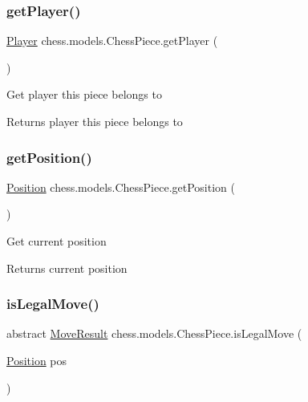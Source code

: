 \subsubsection{\texorpdfstring{get\+Player()}{getPlayer()}}
{\footnotesize\ttfamily \mbox{\hyperlink{enumchess_1_1models_1_1enums_1_1_player}{Player}} chess.\+models.\+Chess\+Piece.\+get\+Player (\begin{DoxyParamCaption}{ }\end{DoxyParamCaption})}

Get player this piece belongs to

\begin{DoxyReturn}{Returns}
player this piece belongs to 
\end{DoxyReturn}
\mbox{\label{classchess_1_1models_1_1_chess_piece_a4ce783eeb2ec6d5cd83af05c11fe8cdb}} 
\subsubsection{\texorpdfstring{get\+Position()}{getPosition()}}
{\footnotesize\ttfamily \mbox{\hyperlink{classchess_1_1models_1_1_position}{Position}} chess.\+models.\+Chess\+Piece.\+get\+Position (\begin{DoxyParamCaption}{ }\end{DoxyParamCaption})}

Get current position

\begin{DoxyReturn}{Returns}
current position 
\end{DoxyReturn}
\mbox{\label{classchess_1_1models_1_1_chess_piece_a60088166dd440bf51de4514c3e57841e}} 
\subsubsection{\texorpdfstring{is\+Legal\+Move()}{isLegalMove()}}
{\footnotesize\ttfamily abstract \mbox{\hyperlink{enumchess_1_1models_1_1enums_1_1_move_result}{Move\+Result}} chess.\+models.\+Chess\+Piece.\+is\+Legal\+Move (\begin{DoxyParamCaption}\item[{\mbox{\hyperlink{classchess_1_1models_1_1_position}{Position}}}]{pos }\end{DoxyParamCaption})\hspace{0.3cm}{\ttfamily [abstract]}}

